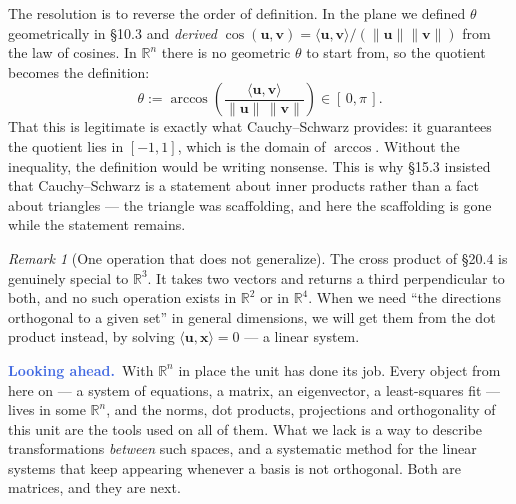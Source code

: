 \documentclass[11pt]{article}
\theoremstyle{definition}
\theoremstyle{remark}
\newtheorem*{rmk}{Remark}
\newcommand{\lookahead}{\par\smallskip\noindent
  \textbf{\sffamily\textcolor{RoyalBlue}{Looking ahead.}}\ \ignorespaces}
\newcommand{\R}{\mathbb{R}}
\newcommand{\vc}[1]{\mathbf{#1}}
\newcommand{\norm}[1]{\lVert #1\rVert}
\begin{document}
The resolution is to reverse the order of definition. In the plane we defined
$\theta$ geometrically in \S10.3 and \emph{derived}
$\cos(\vc{u},\vc{v})=\langle\vc{u},\vc{v}\rangle/(\norm{\vc{u}}\norm{\vc{v}})$
from the law of cosines. In $\R^{n}$ there is no geometric $\theta$ to start
from, so the quotient becomes the definition:
\[
  \theta := \arccos\!\left(
    \frac{\langle\vc{u},\vc{v}\rangle}{\norm{\vc{u}}\,\norm{\vc{v}}}\right)
  \in [\,0,\pi\,] .
\]
That this is legitimate is exactly what Cauchy--Schwarz provides: it guarantees
the quotient lies in $[-1,1]$, which is the domain of $\arccos$. Without the
inequality, the definition would be writing nonsense. This is why \S15.3
insisted that Cauchy--Schwarz is a statement about inner products rather than a
fact about triangles --- the triangle was scaffolding, and here the scaffolding
is gone while the statement remains.

\begin{rmk}[One operation that does not generalize]
The cross product of \S20.4 is genuinely special to $\R^{3}$. It takes two
vectors and returns a third perpendicular to both, and no such operation exists
in $\R^{2}$ or in $\R^{4}$. When we need ``the directions orthogonal to a given
set'' in general dimensions, we will get them from the dot product instead, by
solving $\langle\vc{u},\vc{x}\rangle=0$ --- a linear system.
\end{rmk}

\lookahead With $\R^{n}$ in place the unit has done its job. Every object from
here on --- a system of equations, a matrix, an eigenvector, a least-squares fit
--- lives in some $\R^{n}$, and the norms, dot products, projections and
orthogonality of this unit are the tools used on all of them. What we lack is a
way to describe transformations \emph{between} such spaces, and a systematic
method for the linear systems that keep appearing whenever a basis is not
orthogonal. Both are matrices, and they are next.
\end{document}

